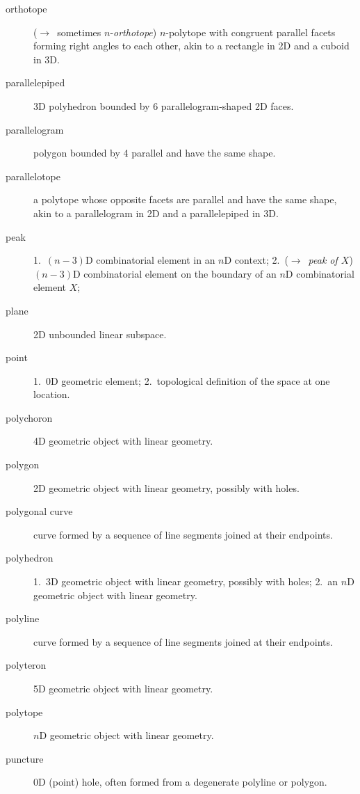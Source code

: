 \begin{multicols}{2}
\begin{description}
\item[orthotope]
($\rightarrow$\ sometimes $n$-\emph{orthotope}) $n$-polytope with congruent parallel facets forming right angles to each other, akin to a rectangle in 2D and a cuboid in 3D.

\item[parallelepiped]
3D polyhedron bounded by 6 parallelogram-shaped 2D faces.

\item[parallelogram]
polygon bounded by 4 parallel and have the same shape.

\item[parallelotope]
a polytope whose opposite facets are parallel and have the same shape, akin to a parallelogram in 2D and a parallelepiped in 3D.

\item[peak]
1.\ $(n-3)$D combinatorial element in an $n$D context;
2.\ ($\rightarrow$\ \emph{peak of $X$}) $(n-3)$D combinatorial element on the boundary of an $n$D combinatorial element $X$;

\item[plane]
2D unbounded linear subspace.

\item[point]
1.\ 0D geometric element;
2.\ topological definition of the space at one location.

\item[polychoron]
4D geometric object with linear geometry.

\item[polygon]
2D geometric object with linear geometry, possibly with holes.

\item[polygonal curve]
curve formed by a sequence of line segments joined at their endpoints.

\item[polyhedron]
1.\ 3D geometric object with linear geometry, possibly with holes;
{\color{gray} 2.\ an $n$D geometric object with linear geometry}.

\item[polyline]
curve formed by a sequence of line segments joined at their endpoints.

\item[polyteron]
5D geometric object with linear geometry.

\item[polytope]
$n$D geometric object with linear geometry.

\item[puncture]
0D (point) hole, often formed from a degenerate polyline or polygon.


\end{description}
\end{multicols}
